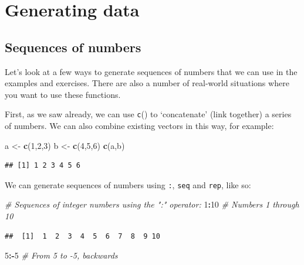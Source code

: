 \documentclass[]{book}
\newenvironment{Shaded}{\begin{snugshade}}{\end{snugshade}}
\newcommand{\CommentTok}[1]{\textcolor[rgb]{0.56,0.35,0.01}{\textit{#1}}}
\newcommand{\DecValTok}[1]{\textcolor[rgb]{0.00,0.00,0.81}{#1}}
\newcommand{\KeywordTok}[1]{\textcolor[rgb]{0.13,0.29,0.53}{\textbf{#1}}}
\newcommand{\NormalTok}[1]{#1}
\newcommand{\OperatorTok}[1]{\textcolor[rgb]{0.81,0.36,0.00}{\textbf{#1}}}
\newcommand{\StringTok}[1]{\textcolor[rgb]{0.31,0.60,0.02}{#1}}
\begin{document}
\hypertarget{generating-data}{%
\section{Generating data}\label{generating-data}}

\hypertarget{sequences}{%
\subsection{Sequences of numbers}\label{sequences}}

Let's look at a few ways to generate sequences of numbers that we can use in the examples and exercises. There are also a number of real-world situations where you want to use these functions.

First, as we saw already, we can use \texttt{c}() to `concatenate' (link together) a series of numbers. We can also combine existing vectors in this way, for example:

\begin{Shaded}
\begin{Highlighting}[]
\NormalTok{a <-}\StringTok{ }\KeywordTok{c}\NormalTok{(}\DecValTok{1}\NormalTok{,}\DecValTok{2}\NormalTok{,}\DecValTok{3}\NormalTok{)}
\NormalTok{b <-}\StringTok{ }\KeywordTok{c}\NormalTok{(}\DecValTok{4}\NormalTok{,}\DecValTok{5}\NormalTok{,}\DecValTok{6}\NormalTok{)}
\KeywordTok{c}\NormalTok{(a,b)}
\end{Highlighting}
\end{Shaded}

\begin{verbatim}
## [1] 1 2 3 4 5 6
\end{verbatim}

We can generate sequences of numbers using \texttt{:}, \texttt{seq} and \texttt{rep}, like so:

\begin{Shaded}
\begin{Highlighting}[]
\CommentTok{# Sequences of integer numbers using the ":" operator:}
\DecValTok{1}\OperatorTok{:}\DecValTok{10}   \CommentTok{# Numbers 1 through 10}
\end{Highlighting}
\end{Shaded}

\begin{verbatim}
##  [1]  1  2  3  4  5  6  7  8  9 10
\end{verbatim}

\begin{Shaded}
\begin{Highlighting}[]
\DecValTok{5}\OperatorTok{:-}\DecValTok{5}   \CommentTok{# From 5 to -5, backwards}
\end{Highlighting}
\end{Shaded}
\end{document}
